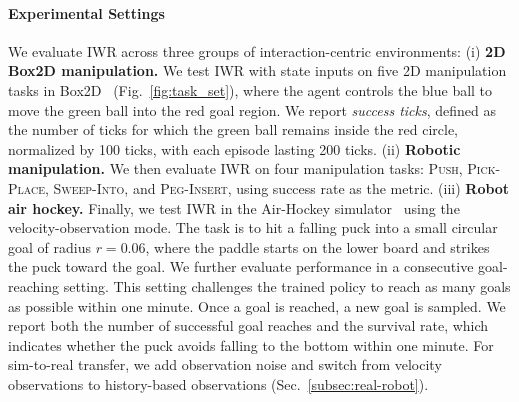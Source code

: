 \paragraph{Experimental Settings}
We evaluate IWR across three groups of interaction-centric environments: 
(i) \textbf{2D Box2D manipulation.} We test IWR with state inputs on five 2D manipulation tasks in Box2D~\citep{catto2026box2d} (Fig.~\ref{fig:task_set}), where the agent controls the blue ball to move the green ball into the red goal region. We report \emph{success ticks}, defined as the number of ticks for which the green ball remains inside the red circle, normalized by 100 ticks, with each episode lasting 200 ticks. 
(ii) \textbf{Robotic manipulation.} We then evaluate IWR on four manipulation tasks: \textsc{Push}, \textsc{Pick-Place}, \textsc{Sweep-Into}, and \textsc{Peg-Insert}, using success rate as the metric. 
(iii) \textbf{Robot air hockey.} Finally, we test IWR in the Air-Hockey simulator~\citep{chuck2024air} using the velocity-observation mode. The task is to hit a falling puck into a small circular goal of radius $r=0.06$, where the paddle starts on the lower board and strikes the puck toward the goal. We further evaluate performance in a consecutive goal-reaching setting. This setting challenges the trained policy to reach as many goals as possible within one minute. Once a goal is reached, a new goal is sampled. We report both the number of successful goal reaches and the survival rate, which indicates whether the puck avoids falling to the bottom within one minute. For sim-to-real transfer, we add observation noise and switch from velocity observations to history-based observations (Sec.~\ref{subsec:real-robot}).

